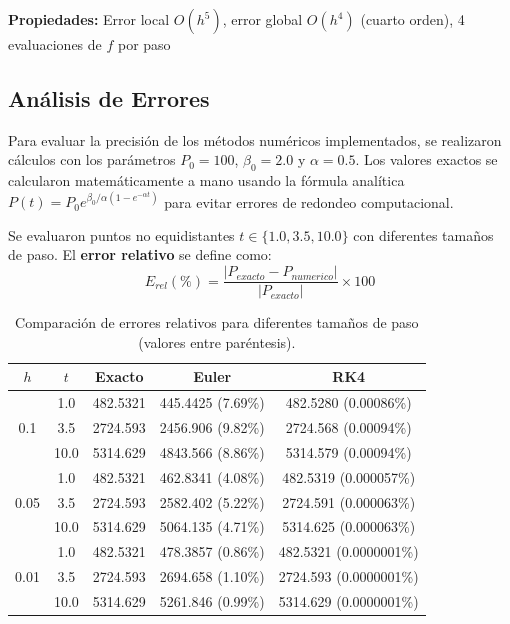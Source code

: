 \documentclass[a4paper,10pt,twocolumn]{article}
\begin{document}
\textbf{Propiedades:} Error local $O(h^5)$, error global $O(h^4)$ (cuarto orden), 4 evaluaciones de $f$ por paso


\subsection{Análisis de Errores}\label{subsec:errores}

Para evaluar la precisión de los métodos numéricos implementados, se realizaron cálculos con los parámetros $P_0 = 100$, $\beta_0 = 2.0$ y $\alpha = 0.5$. Los valores exactos se calcularon matemáticamente a mano usando la fórmula analítica $P(t) = P_0 e^{\beta_0/\alpha (1-e^{-\alpha t})}$ para evitar errores de redondeo computacional.

Se evaluaron puntos no equidistantes $t \in \{1.0, 3.5, 10.0\}$ con diferentes tamaños de paso. El \textbf{error relativo} se define como:
\[E_{rel}(\%) = \frac{|P_{exacto} - P_{numerico}|}{|P_{exacto}|} \times 100\]

\begin{table}[t]
\centering
\footnotesize
\begin{tabular}{|c|c|c|c|c|}
\hline
\textbf{$h$} & \textbf{$t$} & \textbf{Exacto} & \textbf{Euler} & \textbf{RK4} \\
\hline
\multirow{3}{*}{0.1}
  & 1.0  & 482.5321 & 445.4425 (7.69\%) & 482.5280 (0.00086\%) \\
  & 3.5  & 2724.593 & 2456.906 (9.82\%) & 2724.568 (0.00094\%) \\
  & 10.0 & 5314.629 & 4843.566 (8.86\%) & 5314.579 (0.00094\%) \\
\hline
\multirow{3}{*}{0.05}
  & 1.0  & 482.5321 & 462.8341 (4.08\%) & 482.5319 (0.000057\%) \\
  & 3.5  & 2724.593 & 2582.402 (5.22\%) & 2724.591 (0.000063\%) \\
  & 10.0 & 5314.629 & 5064.135 (4.71\%) & 5314.625 (0.000063\%) \\
\hline
\multirow{3}{*}{0.01}
  & 1.0  & 482.5321 & 478.3857 (0.86\%) & 482.5321 (0.0000001\%) \\
  & 3.5  & 2724.593 & 2694.658 (1.10\%) & 2724.593 (0.0000001\%) \\
  & 10.0 & 5314.629 & 5261.846 (0.99\%) & 5314.629 (0.0000001\%) \\
\hline
\end{tabular}
\caption{Comparación de errores relativos para diferentes tamaños de paso (valores entre paréntesis).}
\label{tab:errores}
\end{table}
\end{document}
